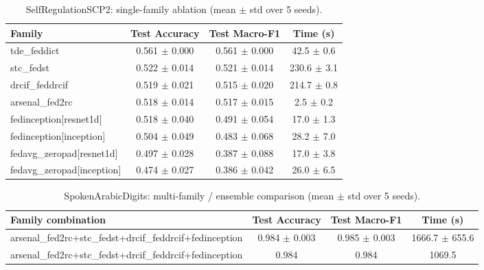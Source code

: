 \begin{table}[t]
\centering
\caption{SelfRegulationSCP2: single-family ablation (mean $\pm$ std over 5 seeds).}
\label{tab:results_selfregulationscp2_ablation}
\begin{tabular}{lccc}
\toprule
Family & Test Accuracy & Test Macro-F1 & Time (s) \\
\midrule
tde\_feddict & 0.561 $\pm$ 0.000 & 0.561 $\pm$ 0.000 & 42.5 $\pm$ 0.6 \\
stc\_fedst & 0.522 $\pm$ 0.014 & 0.521 $\pm$ 0.014 & 230.6 $\pm$ 3.1 \\
drcif\_feddrcif & 0.519 $\pm$ 0.021 & 0.515 $\pm$ 0.020 & 214.7 $\pm$ 0.8 \\
arsenal\_fed2rc & 0.518 $\pm$ 0.014 & 0.517 $\pm$ 0.015 & 2.5 $\pm$ 0.2 \\
fedinception[resnet1d] & 0.518 $\pm$ 0.040 & 0.491 $\pm$ 0.054 & 17.0 $\pm$ 1.3 \\
fedinception[inception] & 0.504 $\pm$ 0.049 & 0.483 $\pm$ 0.068 & 28.2 $\pm$ 7.0 \\
fedavg\_zeropad[resnet1d] & 0.497 $\pm$ 0.028 & 0.387 $\pm$ 0.088 & 17.0 $\pm$ 3.8 \\
fedavg\_zeropad[inception] & 0.474 $\pm$ 0.027 & 0.386 $\pm$ 0.042 & 26.0 $\pm$ 6.5 \\
\bottomrule
\end{tabular}
\end{table}

\begin{table}[t]
\centering
\caption{SpokenArabicDigits: multi-family / ensemble comparison (mean $\pm$ std over 5 seeds).}
\label{tab:results_spokenarabicdigits_ensemble}
\begin{tabular}{lccc}
\toprule
Family combination & Test Accuracy & Test Macro-F1 & Time (s) \\
\midrule
arsenal\_fed2rc+stc\_fedst+drcif\_feddrcif+fedinception & 0.984 $\pm$ 0.003 & 0.985 $\pm$ 0.003 & 1666.7 $\pm$ 655.6 \\
arsenal\_fed2rc+stc\_fedst+drcif\_feddrcif+fedinception & 0.984 & 0.984 & 1069.5 \\
\bottomrule
\end{tabular}
\end{table}

